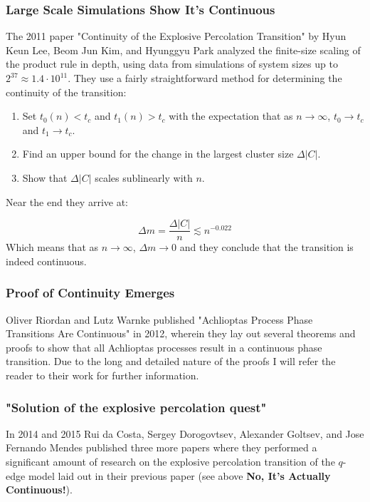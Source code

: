 \subsubsection{Large Scale Simulations Show It's Continuous}
The 2011 paper "Continuity of the Explosive Percolation Transition" \cite{Lee_1} by Hyun Keun Lee, Beom Jun Kim, and Hyunggyu Park analyzed the finite-size scaling of the product rule in depth, using data from simulations of system sizes up to $2^{37} \approx 1.4 \cdot 10^{11}$.
They use a fairly straightforward method for determining the continuity of the transition:

\begin{enumerate}
	\item Set $t_0(n) < t_c$ and $t_1(n) > t_c$ with the expectation that as $n \rightarrow \infty$, $t_0 \rightarrow t_c$ and $t_1 \rightarrow t_c$.
	\item Find an upper bound for the change in the largest cluster size $\Delta |C|$.
	\item Show that $\Delta |C|$ scales sublinearly with $n$.
\end{enumerate}

Near the end they arrive at:

\begin{equation}
	\Delta m = \frac{\Delta |C|}{n} \lesssim n^{-0.022}
\end{equation}
Which means that as $n \rightarrow \infty$, $\Delta m \rightarrow 0$ and they conclude that the transition is indeed continuous.



\subsubsection{Proof of Continuity Emerges}
Oliver Riordan and Lutz Warnke published "Achlioptas Process Phase Transitions Are
Continuous" \cite{Riordan_1} in 2012, wherein they lay out several theorems and proofs to show that all Achlioptas processes result in a continuous phase transition.
Due to the long and detailed nature of the proofs I will refer the reader to their work for further information.



\subsubsection{"Solution of the explosive percolation quest"}
In 2014 and 2015 Rui da Costa, Sergey Dorogovtsev, Alexander Goltsev, and Jose Fernando Mendes published three more papers \cite{da_Costa_5, da_Costa_2, da_Costa_3} where they performed a significant amount of research on the explosive percolation transition of the $q$-edge model laid out in their previous paper (see above \textbf{No, It's Actually Continuous!}).

